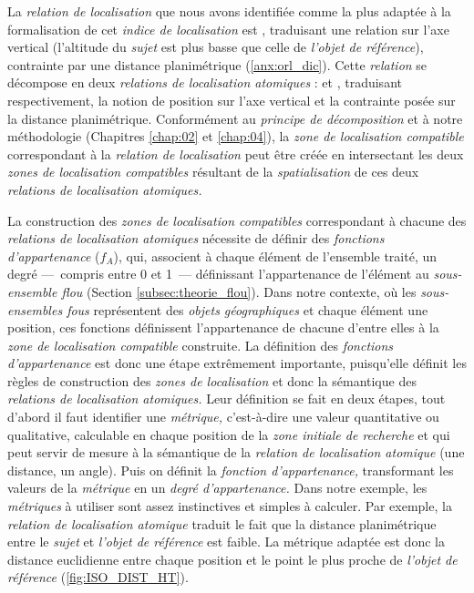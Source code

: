 La \emph{relation de localisation} que nous avons identifiée comme la
plus adaptée à la formalisation de cet \emph{indice de localisation}
est , traduisant une relation sur l'axe
vertical (l'altitude du \emph{sujet} est plus basse que celle de
\emph{l'objet de référence}), contrainte par une distance
planimétrique (\autoref{anx:orl_dic}). Cette \emph{relation} se
décompose en deux \emph{relations de localisation atomiques} :
 et
,
traduisant respectivement, la notion de position sur l'axe vertical et
la contrainte posée sur la distance planimétrique. Conformément au
\emph{principe de décomposition} et à notre méthodologie (Chapitres
\ref{chap:02} et \ref{chap:04}), la \emph{zone de localisation
  compatible} correspondant à la \emph{relation de localisation}
 peut être créée en intersectant les
deux \emph{zones de localisation compatibles} résultant de la
\emph{spatialisation} de ces deux \emph{relations de localisation
  atomiques.}

La construction des \emph{zones de localisation compatibles}
correspondant à chacune des \emph{relations de localisation atomiques}
nécessite de définir des \emph{fonctions d'appartenance} ($f_A$), qui,
associent à chaque élément de l'ensemble traité, un degré ---~compris
entre 0 et 1~--- définissant l'appartenance de l'élément au
\emph{sous-ensemble flou} (Section \ref{subsec:theorie_flou}). Dans
notre contexte, où les \emph{sous-ensembles fous} représentent des
\emph{objets géographiques} et chaque élément une position, ces
fonctions définissent l'appartenance de chacune d'entre elles à la
\emph{zone de localisation compatible} construite. La définition des
\emph{fonctions d'appartenance} est donc une étape extrêmement
importante, puisqu'elle définit les règles de construction des
\emph{zones de localisation} et donc la sémantique des \emph{relations
  de localisation atomiques.} Leur définition se fait en deux étapes,
tout d'abord il faut identifier une \emph{métrique,} c'est-à-dire une
valeur quantitative ou qualitative, calculable en chaque position de
la \emph{zone initiale de recherche} et qui peut servir de mesure à la
sémantique de la \emph{relation de localisation atomique} (\eg une
distance, un angle). Puis on définit la \emph{fonction
  d'appartenance,} transformant les valeurs de la \emph{métrique} en
un \emph{degré d'appartenance.} Dans notre exemple, les
\emph{métriques} à utiliser sont assez instinctives et simples à
calculer. Par exemple, la \emph{relation de localisation atomique}
traduit le fait que la distance planimétrique entre le \emph{sujet} et
\emph{l'objet de référence} est faible. La métrique adaptée est donc
la distance euclidienne entre chaque position et le point le plus
proche de \emph{l'objet de référence} (\autoref{fig:ISO_DIST_HT}).

